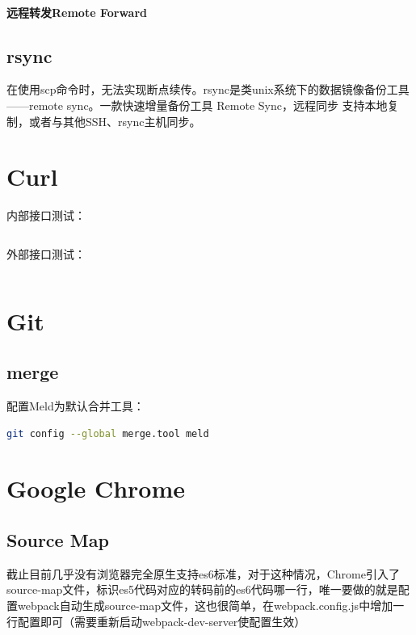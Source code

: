\documentclass[letter]{book}
\begin{document}
\paragraph{远程转发Remote Forward}

\subsection{rsync}

在使用scp命令时，无法实现断点续传。rsync是类unix系统下的数据镜像备份工具——remote sync。一款快速增量备份工具 Remote Sync，远程同步 支持本地复制，或者与其他SSH、rsync主机同步。

\section{Curl}

内部接口测试：

\begin{lstlisting}[language=Bash]

\end{lstlisting}

外部接口测试：


\begin{lstlisting}[language=Bash]

\end{lstlisting}

\section{Git}

\subsection{merge}

配置Meld为默认合并工具：

\begin{lstlisting}[language=Bash]
git config --global merge.tool meld
\end{lstlisting}

\section{Google Chrome}

\subsection{Source Map}

截止目前几乎没有浏览器完全原生支持es6标准，对于这种情况，Chrome引入了source-map文件，标识es5代码对应的转码前的es6代码哪一行，唯一要做的就是配置webpack自动生成source-map文件，这也很简单，在webpack.config.js中增加一行配置即可（需要重新启动webpack-dev-server使配置生效）
\end{document}
